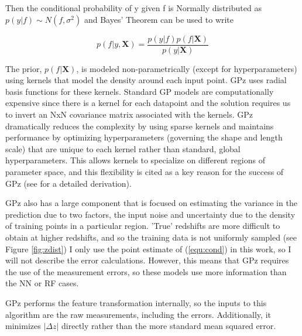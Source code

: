 \documentclass[13pt]{amsart}
\newcommand{\bX}{\textbf{X}}
\newcommand{\nequ}[2]{\begin{equation}#1 \label{#2}\end{equation}}
\newcommand{\equin}[1]{\(#1\)}
\begin{document}
      Then the conditional probability of y given f is Normally distributed as
      \equin{p(y|f) \sim N(f,\sigma^2)} and Bayes' Theorem can be used to write

      \nequ{p(f|y,\bX) = \frac{p(y|f) p(f|\bX)}{p(y|\bX)}}{equ:cond}

      The prior, \equin{p(f|\bX)}, is modeled non-parametrically (except for hyperparameters) using kernels that model the density around each input point. GPz uses radial basis functions for these kernels. Standard GP models are computationally expensive since there is a kernel for each datapoint and the solution requires us to invert an NxN covariance matrix associated with the kernels. GPz dramatically reduces the complexity by using sparse kernels and maintains performance by optimizing hyperparameters (governing the shape and length scale) that are unique to each kernel rather than standard, global hyperparameters. This allows kernels to specialize on different regions of parameter space, and this flexibility is cited as a key reason for the success of GPz (see \cite{sgp} for a detailed derivation).

      GPz also has a large component that is focused on estimating the variance in the prediction due to two factors, the input noise and uncertainty due to the density of training points in a particular region. 'True' redshifts are more difficult to obtain at higher redshifts, and so the training data is not uniformly sampled (see Figure \ref{fig:zdist}) I only use the point estimate of (\ref{equ:cond}) in this work, so I will not describe the error calculations. However, this means that GPz requires the use of the measurement errors, so these models use more information than the NN or RF cases.

      GPz performs the feature transformation internally, so the inputs to this algorithm are the raw measurements, including the errors. Additionally, it minimizes
      \equin{| \Delta z |} directly rather than the more standard mean squared error.
\end{document}
